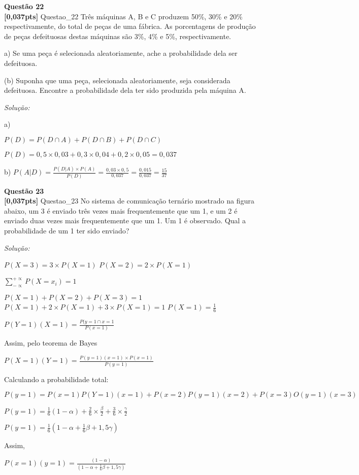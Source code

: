 \documentclass{article}
\newenvironment{problem}[2][Questão]
    { \begin{mdframed}[backgroundcolor=gray!20] \textbf{#1 #2} \\}
    {  \end{mdframed}}
\newenvironment{solution}
    {\textit{Solução:}}
    {}
\begin{document}
\begin{problem}{22}
\textbf{[0,037pts]} Questao\_22 Três máquinas A, B e C produzem 50\%, 30\% e 20\% respectivamente, do total de peças de uma fábrica. As porcentagens de produção de peças defeituosas destas máquinas são 3\%, 4\% e 5\%, respectivamente. 

a) Se uma peça é selecionada aleatoriamente, ache a probabilidade dela ser defeituosa. 

(b) Suponha que uma peça, selecionada aleatoriamente, seja considerada defeituosa. Encontre a probabilidade dela ter sido produzida pela máquina A.
\end{problem}

\begin{solution}

a)

$P(D) = P(D \cap A) + P(D \cap B) + P(D \cap C)$

$P(D) = 0,5 \times 0,03 + 0,3 \times 0,04 + 0,2 \times 0,05 = 0,037$

b) $P(A|D) = \frac{P(D|A) \times P(A)}{P(D)} = \frac{0,03 \times 0,5}{0,037} = \frac{0,015}{0,037} = \frac{15}{37}$

\end{solution}

\begin{problem}{23}
\textbf{[0,037pts]} Questao\_23 No sistema de comunicação ternário mostrado na figura abaixo, um 3 é enviado três vezes 
mais frequentemente que um 1, e um 2 é enviado duas vezes mais frequentemente que um 1. 
Um 1 é observado. Qual a probabilidade de um 1 ter sido enviado? 
\end{problem}

\begin{solution}

$P(X=3) = 3 \times P(X=1)$
$P(X=2) = 2 \times P(X=1)$

$\sum_{-\propto}^{+\propto} P(X=x_{i}) = 1$

$P(X=1) + P(X=2) + P(X=3) = 1$
$P(X=1) +2 \times P(X=1) + 3 \times P(X=1) = 1$
$P(X=1) = \frac{1}{6}$

$P(Y=1)(X=1) = \frac{P(y=1 \cap x=1}{P(x=1)} $

Assim, pelo teorema de Bayes

$P(X=1)(Y=1) = \frac{P(y=1)(x=1) \times P(x=1)}{P(y=1)} $

Calculando a probabilidade total:

$P(y=1) = P(x=1)P(Y=1)(x=1) + P(x=2)P(y=1)(x=2) + P(x=3)O(y=1)(x=3)$

$P(y=1) = \frac{1}{6}(1-\alpha)+\frac{2}{6} \times \frac{\beta}{2} + \frac{3}{6} \times \frac{\gamma}{2}$

$P(y=1) = \frac{1}{6}(1- \alpha + \frac{1}{6}\beta + 1,5\gamma)$

Assim,

$P(x=1)(y=1) = \frac{(1-\alpha)}{(1- \alpha + \frac{1}{6}\beta + 1,5\gamma)}$

\end{solution}
\end{document}
